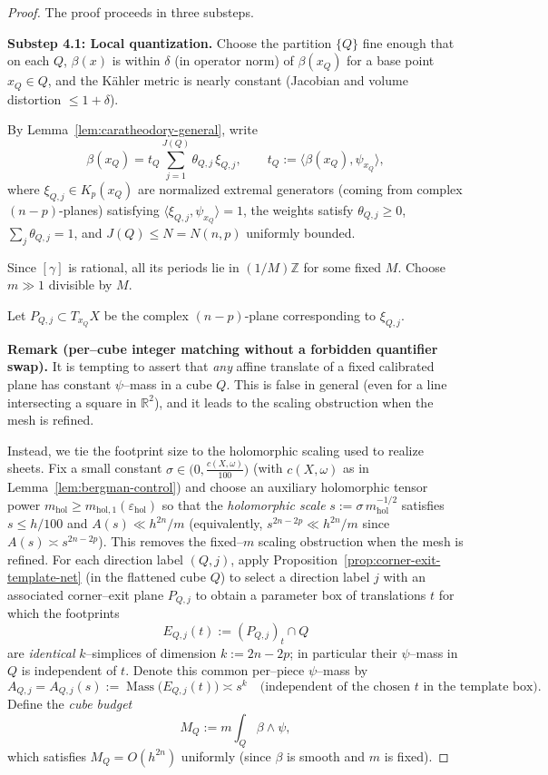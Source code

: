 \documentclass[11pt]{article}
\numberwithin{equation}{section}  %
\theoremstyle{plain}
\theoremstyle{definition}
\theoremstyle{remark}
\newcommand{\R}{\mathbb{R}}
\newcommand{\Z}{\mathbb{Z}}
\newcommand{\mhol}{m_{\mathrm{hol}}} %
\DeclareMathOperator{\Mass}{Mass}
\begin{document}
\begin{proof}
The proof proceeds in three substeps.

\medskip\noindent
\textbf{Substep 4.1: Local quantization.}
Choose the partition $\{Q\}$ fine enough that on each $Q$, $\beta(x)$
is within $\delta$ (in operator norm) of $\beta(x_Q)$ for a base point
$x_Q\in Q$, and the K\"ahler metric is nearly constant (Jacobian and
volume distortion $\le 1+\delta$).

By Lemma~\ref{lem:caratheodory-general}, write
\[
\beta(x_Q)=t_Q\sum_{j=1}^{J(Q)}\theta_{Q,j}\,\xi_{Q,j},
\qquad
t_Q:=\langle \beta(x_Q),\psi_{x_Q}\rangle,
\]
where $\xi_{Q,j}\in K_p(x_Q)$ are normalized extremal generators (coming from
complex $(n-p)$-planes) satisfying $\langle \xi_{Q,j},\psi_{x_Q}\rangle=1$,
the weights satisfy $\theta_{Q,j}\ge 0$, $\sum_j\theta_{Q,j}=1$, and
$J(Q)\le N=N(n,p)$ uniformly bounded.

Since $[\gamma]$ is rational, all its periods lie in $(1/M)\Z$ for some
fixed $M$.  Choose $m\gg 1$ divisible by $M$.

Let $P_{Q,j}\subset T_{x_Q}X$ be the complex $(n-p)$-plane corresponding to $\xi_{Q,j}$.

\smallskip\noindent\textbf{Remark (per--cube integer matching without a forbidden quantifier swap).}
It is tempting to assert that \emph{any} affine translate of a fixed calibrated plane has constant $\psi$--mass in a cube $Q$.
This is false in general (even for a line intersecting a square in $\R^2$), and it leads to the scaling obstruction when the mesh is refined.

Instead, we tie the footprint size to the holomorphic scaling used to realize sheets.
Fix a small constant $\sigma\in\bigl(0,\tfrac{c(X,\omega)}{100}\bigr)$ (with $c(X,\omega)$ as in Lemma~\ref{lem:bergman-control})
and choose an auxiliary holomorphic tensor power $\mhol\ge m_{\mathrm{hol},1}(\varepsilon_{\mathrm{hol}})$ so that the
\emph{holomorphic scale} $s:=\sigma\,\mhol^{-1/2}$ satisfies $s\le h/100$ and
$A(s)\ll h^{2n}/m$ (equivalently, $s^{2n-2p}\ll h^{2n}/m$ since $A(s)\asymp s^{2n-2p}$).
This removes the fixed--$m$ scaling obstruction when the mesh is refined.
For each direction label $(Q,j)$, apply Proposition~\ref{prop:corner-exit-template-net} (in the flattened cube $Q$) to select a direction label $j$ with an associated corner--exit plane $P_{Q,j}$
to obtain a parameter box of translations $t$ for which the footprints
\[
E_{Q,j}(t):=(P_{Q,j})_t\cap Q
\]
are \emph{identical} $k$--simplices of dimension $k:=2n-2p$; in particular their $\psi$--mass in $Q$ is independent of $t$.
Denote this common per--piece $\psi$--mass by
\[
A_{Q,j}=A_{Q,j}(s):=\Mass\bigl(E_{Q,j}(t)\bigr)\asymp s^{k}
\quad\text{(independent of the chosen }t\text{ in the template box).}
\]
Define the \emph{cube budget}
\[
M_Q := m\int_Q \beta\wedge\psi ,
\]
which satisfies $M_Q=O(h^{2n})$ uniformly (since $\beta$ is smooth and $m$ is fixed).


\end{proof}
\end{document}
